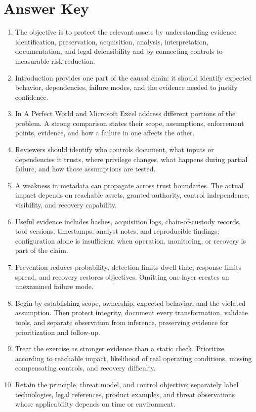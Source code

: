 \documentclass[11pt,letterpaper]{article}
\begin{document}
\section*{Answer Key}
\begin{enumerate}
\item The objective is to protect the relevant assets by understanding evidence identification, preservation, acquisition, analysis, interpretation, documentation, and legal defensibility and by connecting controls to measurable risk reduction.
\item Introduction provides one part of the causal chain: it should identify expected behavior, dependencies, failure modes, and the evidence needed to justify confidence.
\item In A Perfect World and Microsoft Excel address different portions of the problem. A strong comparison states their scope, assumptions, enforcement points, evidence, and how a failure in one affects the other.
\item Reviewers should identify who controls document, what inputs or dependencies it trusts, where privilege changes, what happens during partial failure, and how those assumptions are tested.
\item A weakness in metadata can propagate across trust boundaries. The actual impact depends on reachable assets, granted authority, control independence, visibility, and recovery capability.
\item Useful evidence includes hashes, acquisition logs, chain-of-custody records, tool versions, timestamps, analyst notes, and reproducible findings; configuration alone is insufficient when operation, monitoring, or recovery is part of the claim.
\item Prevention reduces probability, detection limits dwell time, response limits spread, and recovery restores objectives. Omitting one layer creates an unexamined failure mode.
\item Begin by establishing scope, ownership, expected behavior, and the violated assumption. Then protect integrity, document every transformation, validate tools, and separate observation from inference, preserving evidence for prioritization and follow-up.
\item Treat the exercise as stronger evidence than a static check. Prioritize according to reachable impact, likelihood of real operating conditions, missing compensating controls, and recovery difficulty.
\item Retain the principle, threat model, and control objective; separately label technologies, legal references, product examples, and threat observations whose applicability depends on time or environment.
\end{enumerate}
\end{document}
